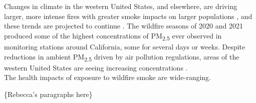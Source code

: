 \documentclass[gmd, manuscript]{copernicus}
\begin{document}


\introduction[Introduction]

Changes in climate in the western United States, and elsewhere, are
driving larger, more intense fires with greater smoke impacts on larger
populations \citep{Burke2021}, and these trends are projected to
continue \citep{Hurteau2014}. The wildfire seasons of 2020 and 2021
produced some of the highest concentrations of PM\textsubscript{2.5}
ever observed in monitoring stations around California, some for several
days or weeks. Despite reductions in ambient PM\textsubscript{2.5}
driven by air pollution regulations, areas of the western United States
are seeing increasing concentrations \citep{McClure2018}.\\
The health impacts of exposure to wildfire smoke are wide-ranging.

\{Rebecca's paragraphs here\}
\end{document}

